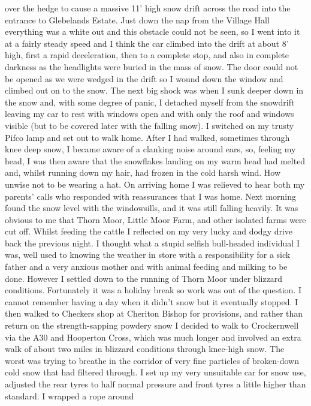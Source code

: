 over the hedge to cause a massive 11' high snow drift across the road into the
entrance to Glebelands Estate. Just down the nap from the Village Hall
everything was a white out and this obstacle could not be seen, so I went into
it at a fairly steady speed and I think the car climbed into the drift at about
8' high, first a rapid deceleration, then to a complete stop, and also in
complete darkness as the headlights were buried in the mass of snow. The door
could not be opened as we were wedged in the drift so I wound down the window
and climbed out on to the snow. The next big shock was when I sunk deeper down
in the snow and, with some degree of panic, I detached myself from the
snowdrift leaving my car to rest with windows open and with only the roof and
windows visible (but to be covered later with the falling snow). I switched on
my trusty Pifco lamp and set out to walk home. After I had walked, sometimes
through knee deep snow, I became aware of a clanking noise around ears, so,
feeling my head, I was then aware that the snowflakes landing on my warm head
had melted and, whilst running down my hair, had frozen in the cold harsh wind.
How unwise not to be wearing a hat. On arriving home I was relieved to hear
both my parents' calls who responded with reassurances that I was home. Next
morning found the snow level with the windowsills, and it was still falling
heavily. It was obvious to me that Thorn Moor, Little Moor Farm, and other
isolated farms were cut off. Whilst feeding the cattle I reflected on my very
lucky and dodgy drive back the previous night. I thought what a stupid selfish
bull-headed individual I was, well used to knowing the weather in store with a
responsibility for a sick father and a very anxious mother and with animal
feeding and milking to be done. However I settled down to the running of Thorn
Moor under blizzard conditions. Fortunately it was a holiday break so work was
out of the question. I cannot remember having a day when it didn't snow but it
eventually stopped. I then walked to Checkers shop at Cheriton Bishop for
provisions, and rather than return on the strength-sapping powdery snow I
decided to walk to Crockernwell via the A30 and Hooperton Cross, which was much
longer and involved an extra walk of about two miles in blizzard conditions
through knee-high snow. The worst was trying to breathe in the corridor of very
fine particles of broken-down cold snow that had filtered through. I set up my
very unsuitable car for snow use, adjusted the rear tyres to half normal
pressure and front tyres a little higher than standard. I wrapped a rope around
